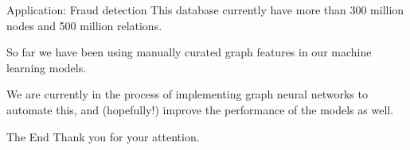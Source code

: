 \documentclass{beamer}
\begin{document}
\begin{frame}{Application: Fraud detection}
  This database currently have more than 300 million nodes and 500 
  million relations.

  \pause So far we have been using manually curated graph features in our
  machine learning models.

  \pause We are currently in the process of implementing graph neural 
  networks to automate this, and (hopefully!) improve the performance of the
  models as well.
\end{frame}

\begin{frame}{The End}
  \centering\Large Thank you for your attention.
\end{frame}
\end{document}
